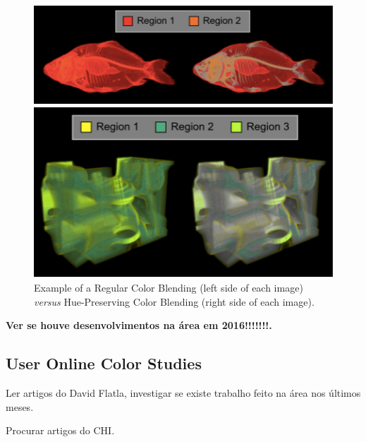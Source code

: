 %
\begin{figure}[!h]
  \centering%
  \begin{minipage}{0.3\textwidth}
    \includegraphics[width=\linewidth]{images/background/HuePreserving_3.png}
  \end{minipage}%
  \hspace{0.2\textwidth}%
  \begin{minipage}{0.3\textwidth}\centering
    \includegraphics[width=\linewidth]{images/background/HuePreserving_4.png}
  \end{minipage}%
  \caption[Hue-Preserving Color Blending Examples]{Example of a Regular Color Blending (left side of each image) \emph{versus}
    Hue-Preserving Color Blending (right side of each image). \protect\cite{Chuang2009}}
  \label{fig:examples}
\end{figure}
%

\textbf{Ver se houve desenvolvimentos na área em 2016!!!!!!!.} \par
%
\subsection{User Online Color Studies}
\label{subsec:colorstudies}
%
Ler artigos do David Flatla, investigar se existe trabalho feito na área nos últimos meses. \par
Procurar artigos do CHI. \par
%

